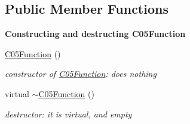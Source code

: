 \subsection*{Public Member Functions}
\begin{Indent}\textbf{ Constructing and destructing C05\+Function}\par
\begin{DoxyCompactItemize}
\item 
\mbox{\label{class_s_m_spp__di__unipi__it_1_1_c05_function_a39fbae51b50d91defb5766a5d0a306eb}} 
\mbox{\hyperlink{class_s_m_spp__di__unipi__it_1_1_c05_function_a39fbae51b50d91defb5766a5d0a306eb}{C05\+Function}} ()
\begin{DoxyCompactList}\small\item\em constructor of \mbox{\hyperlink{class_s_m_spp__di__unipi__it_1_1_c05_function}{C05\+Function}}\+: does nothing \end{DoxyCompactList}\item 
\mbox{\label{class_s_m_spp__di__unipi__it_1_1_c05_function_a70225e98f1df27bc4a05fb0714f73aaf}} 
virtual \mbox{\hyperlink{class_s_m_spp__di__unipi__it_1_1_c05_function_a70225e98f1df27bc4a05fb0714f73aaf}{$\sim$\+C05\+Function}} ()
\begin{DoxyCompactList}\small\item\em destructor\+: it is virtual, and empty \end{DoxyCompactList}\end{DoxyCompactItemize}
\end{Indent}
